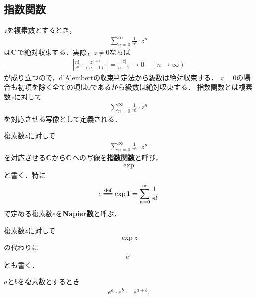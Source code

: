 \subsection{指数関数}
	
	$z$を複素数とするとき，
	\begin{align}
		\sum_{n=0}^\infty \frac{1}{n!} \cdot z^n
	\end{align}
	は$\mathbf{C}$で絶対収束する．実際，$z \neq 0$ならば
	\begin{align}
		\left|\frac{n!}{z^n} \cdot \frac{z^{n+1}}{(n+1)!}\right|
		= \frac{|z|}{n+1}
		\longrightarrow 0\quad (n \longrightarrow \infty)
	\end{align}
	が成り立つので，d'Alembertの収束判定法から級数は絶対収束する．
	$z=0$の場合も初項を除く全ての項は$0$であるから級数は絶対収束する．
	指数関数とは複素数$z$に対して
	\begin{align}
		\sum_{n = 0}^\infty \frac{1}{n!} \cdot z^n
	\end{align}
	を対応させる写像として定義される．
	
	\begin{screen}
		\begin{dfn}[指数関数]
			複素数$z$に対して
			\begin{align}
				\sum_{n=0}^\infty \frac{1}{n!} \cdot z^n
			\end{align}
			を対応させる$\mathbf{C}$から$\mathbf{C}$への写像を{\bf 指数関数}と呼び，
			\begin{align}
				\exp
			\end{align}
			と書く．特に
			\begin{align}
				e \defeq \exp{1} = \sum_{n=0}^\infty \frac{1}{n!}
			\end{align}
			で定める複素数$e$を{\bf Napier数}と呼ぶ．
		\end{dfn}
	\end{screen}
	
	複素数$z$に対して
	\begin{align}
		\exp{z}
	\end{align}
	の代わりに
	\begin{align}
		e^z
	\end{align}
	とも書く．
	
	\begin{screen}
		\begin{thm}[指数法則]
			$a$と$b$を複素数とするとき
			\begin{align}
				e^a \cdot e^b = e^{a + b}.
			\end{align}
		\end{thm}
	\end{screen}
	
